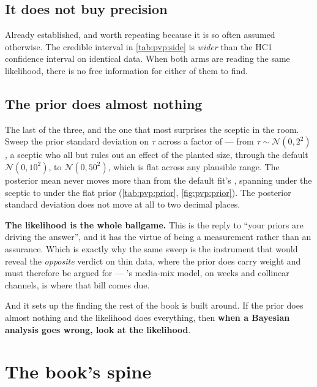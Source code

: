 \subsection*{It does not buy precision}

Already established, and worth repeating because it is so often assumed otherwise. The credible
interval in \cref{tab:pvp:side} is \pc{\nbZeroWidthRatioPct} \emph{wider} than the HC1 confidence
interval on identical data. When both arms are reading the same likelihood, there is no free
information for either of them to find.

\subsection*{The prior does almost nothing}

The last of the three, and the one that most surprises the sceptic in the room. Sweep the prior
standard deviation on $\tau$ across a factor of \nbZeroPriorRatio{} --- from
$\tau \sim \mathcal N(0, 2^2)$, a sceptic who all but rules out an effect of the planted size,
through the default $\mathcal N(0, 10^2)$, to $\mathcal N(0, 50^2)$, which is flat across any
plausible range. The posterior mean never moves more than \eur{\nbZeroPriorShift} from the default
fit's \eur{\nbZeroBayesMean}, spanning \eur{\nbZeroPriorTightMean} under the sceptic to
\eur{\nbZeroPriorFlatMean} under the flat prior (\cref{tab:pvp:prior}, \cref{fig:pvp:prior}). The
posterior standard deviation does not move at all to two decimal places.




\textbf{The likelihood is the whole ballgame.} This is the reply to ``your priors are driving the
answer'', and it has the virtue of being a measurement rather than an assurance. Which is exactly
why the same sweep is the instrument that would reveal the \emph{opposite} verdict on thin data,
where the prior does carry weight and must therefore be argued for --- 's media-mix
model, on \nbSixNWeeks{} weeks and collinear channels, is where that bill comes due.

And it sets up the finding the rest of the book is built around. If the prior does almost nothing
and the likelihood does everything, then \textbf{when a Bayesian analysis goes wrong, look at the
likelihood}.

\section{The book's spine}
\label{sec:pvp:spine}

